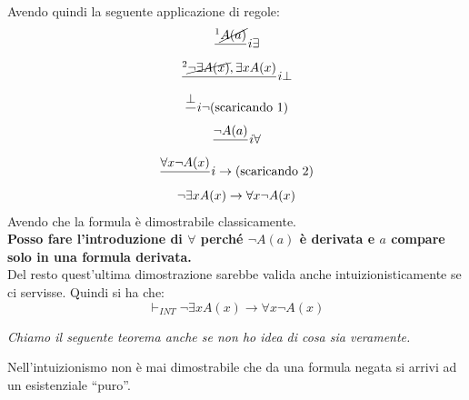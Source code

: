 \documentclass[a4paper,12pt, oneside]{book}
\begin{document}
\begin{esempio}
\begin{enumerate}
  \end{enumerate}
  Avendo quindi la seguente applicazione di regole:
  \begin{gather*}
    \frac{^1\cancel{A(a)}}{}i\exists\\
    \frac{^2\cancel{\neg \exists A(x)},\exists x A(x)}{}i\bot\\
    \frac{\bot}{}i\neg\mbox{(scaricando 1)}\\
    \frac{\neg A(a)}{}i\forall\\
    \frac{\forall x\neg A(x)}{}i\to\mbox{(scaricando 2)}\\
    \neg\exists x A(x)\to \forall x \neg A(x)
  \end{gather*}
  Avendo che la formula è dimostrabile classicamente.\\
  \textbf{Posso fare l'introduzione di $\forall$ perché $\neg A(a)$ è
    derivata e $a$ compare solo in una formula derivata.}\\
  Del resto quest'ultima  dimostrazione
  sarebbe valida anche intuizionisticamente se ci servisse. Quindi si ha che:
  \[\vdash_{INT}\neg\exists x A(x)\to \forall x \neg A(x)\] 
\end{esempio}
\textit{Chiamo il seguente teorema anche se non ho idea di cosa sia
  veramente.}\\ 
\begin{teorema}
  Nell'intuizionismo non è mai dimostrabile che da una formula negata si arrivi
  ad un esistenziale ``puro''. 
\end{teorema}
\end{document}
